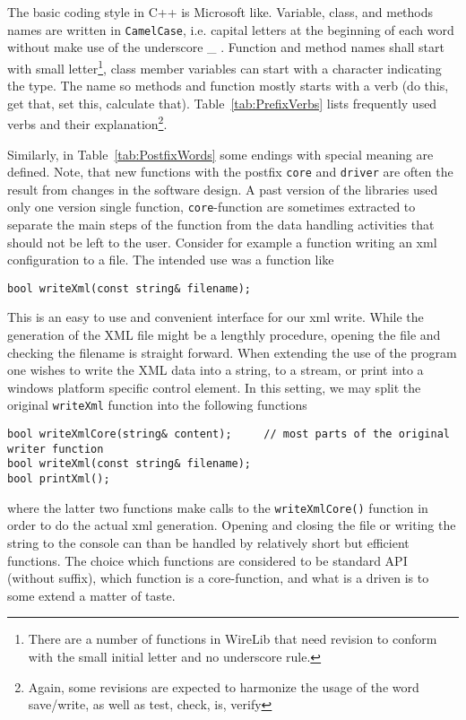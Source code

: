 \documentclass[11pt,a4paper,onepage,openany]{book}
\begin{document}
The basic coding style in C++ is Microsoft like. Variable, class, and methods
names are written in \texttt{CamelCase}, i.e. capital letters at the beginning
of each word without make use of the underscore \_ . Function and method names
shall start with small letter\footnote{There are a number of functions in
WireLib that need revision to conform with the small initial letter and no
underscore rule.}, class member variables can start with a character indicating
the type. The name so methods and function mostly starts with a verb (do this,
get that, set this, calculate that). Table~\ref{tab:PrefixVerbs} lists
frequently used verbs and their explanation\footnote{Again, some revisions are
expected to harmonize the usage of the word save/write, as well as test, check,
is, verify}.

Similarly, in Table~\ref{tab:PostfixWords} some endings with special meaning
are defined. Note, that new functions with the postfix \texttt{core} and
\texttt{driver} are often the result from changes in the software design. A
past version of the libraries used only one version single function,
\texttt{core}-function are sometimes extracted to separate the main steps of
the function from the data handling activities that should not be left to the
user. Consider for example a function writing an xml configuration to a file.
The intended use was a function like
\begin{verbatim}
bool writeXml(const string& filename);
\end{verbatim}
This is an easy to use and convenient interface for our xml write. While the
generation of the XML file might be a lengthly procedure, opening the file and
checking the filename is straight forward. When extending the use of the
program one wishes to write the XML data into a string, to a stream, or print
into a windows platform specific control element. In this setting, we may split
the original \texttt{writeXml} function into the following functions
\begin{verbatim}
bool writeXmlCore(string& content);     // most parts of the original writer function
bool writeXml(const string& filename);
bool printXml();
\end{verbatim}
where the latter two functions make calls to the \texttt{writeXmlCore()}
function in order to do the actual xml generation. Opening and closing the file
or writing the string to the console can than be handled by relatively short
but efficient functions. The choice which functions are considered to be
standard API (without suffix), which function is a core-function, and what is a
driven is to some extend a matter of taste.
\end{document}
